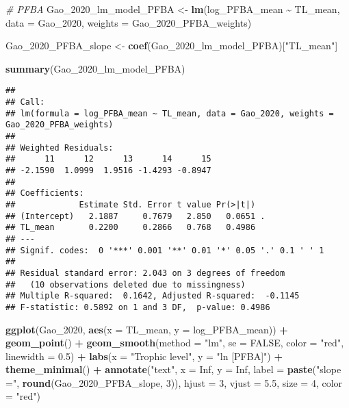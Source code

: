 \documentclass[
]{article}
\newenvironment{Shaded}{\begin{snugshade}}{\end{snugshade}}
\newcommand{\AttributeTok}[1]{\textcolor[rgb]{0.13,0.29,0.53}{#1}}
\newcommand{\CommentTok}[1]{\textcolor[rgb]{0.56,0.35,0.01}{\textit{#1}}}
\newcommand{\ConstantTok}[1]{\textcolor[rgb]{0.56,0.35,0.01}{#1}}
\newcommand{\DecValTok}[1]{\textcolor[rgb]{0.00,0.00,0.81}{#1}}
\newcommand{\FloatTok}[1]{\textcolor[rgb]{0.00,0.00,0.81}{#1}}
\newcommand{\FunctionTok}[1]{\textcolor[rgb]{0.13,0.29,0.53}{\textbf{#1}}}
\newcommand{\NormalTok}[1]{#1}
\newcommand{\OtherTok}[1]{\textcolor[rgb]{0.56,0.35,0.01}{#1}}
\newcommand{\SpecialCharTok}[1]{\textcolor[rgb]{0.81,0.36,0.00}{\textbf{#1}}}
\newcommand{\StringTok}[1]{\textcolor[rgb]{0.31,0.60,0.02}{#1}}
\begin{document}
\begin{Shaded}
\begin{Highlighting}[]
\CommentTok{\# PFBA}
\NormalTok{Gao\_2020\_lm\_model\_PFBA }\OtherTok{\textless{}{-}} \FunctionTok{lm}\NormalTok{(log\_PFBA\_mean }\SpecialCharTok{\textasciitilde{}}\NormalTok{ TL\_mean,}
                             \AttributeTok{data =}\NormalTok{ Gao\_2020,}
                             \AttributeTok{weights =}\NormalTok{ Gao\_2020\_PFBA\_weights)}

\NormalTok{Gao\_2020\_PFBA\_slope }\OtherTok{\textless{}{-}} \FunctionTok{coef}\NormalTok{(Gao\_2020\_lm\_model\_PFBA)[}\StringTok{"TL\_mean"}\NormalTok{]}

\FunctionTok{summary}\NormalTok{(Gao\_2020\_lm\_model\_PFBA)}
\end{Highlighting}
\end{Shaded}

\begin{verbatim}
## 
## Call:
## lm(formula = log_PFBA_mean ~ TL_mean, data = Gao_2020, weights = Gao_2020_PFBA_weights)
## 
## Weighted Residuals:
##      11      12      13      14      15 
## -2.1590  1.0999  1.9516 -1.4293 -0.8947 
## 
## Coefficients:
##             Estimate Std. Error t value Pr(>|t|)  
## (Intercept)   2.1887     0.7679   2.850   0.0651 .
## TL_mean       0.2200     0.2866   0.768   0.4986  
## ---
## Signif. codes:  0 '***' 0.001 '**' 0.01 '*' 0.05 '.' 0.1 ' ' 1
## 
## Residual standard error: 2.043 on 3 degrees of freedom
##   (10 observations deleted due to missingness)
## Multiple R-squared:  0.1642, Adjusted R-squared:  -0.1145 
## F-statistic: 0.5892 on 1 and 3 DF,  p-value: 0.4986
\end{verbatim}

\begin{Shaded}
\begin{Highlighting}[]
\FunctionTok{ggplot}\NormalTok{(Gao\_2020, }\FunctionTok{aes}\NormalTok{(}\AttributeTok{x =}\NormalTok{ TL\_mean, }\AttributeTok{y =}\NormalTok{ log\_PFBA\_mean)) }\SpecialCharTok{+}
  \FunctionTok{geom\_point}\NormalTok{() }\SpecialCharTok{+}
  \FunctionTok{geom\_smooth}\NormalTok{(}\AttributeTok{method =} \StringTok{"lm"}\NormalTok{, }\AttributeTok{se =} \ConstantTok{FALSE}\NormalTok{, }\AttributeTok{color =} \StringTok{"red"}\NormalTok{, }\AttributeTok{linewidth =} \FloatTok{0.5}\NormalTok{) }\SpecialCharTok{+}
  \FunctionTok{labs}\NormalTok{(}\AttributeTok{x =} \StringTok{"Trophic level"}\NormalTok{,}
       \AttributeTok{y =} \StringTok{"ln [PFBA]"}\NormalTok{) }\SpecialCharTok{+}
  \FunctionTok{theme\_minimal}\NormalTok{() }\SpecialCharTok{+}
  \FunctionTok{annotate}\NormalTok{(}\StringTok{"text"}\NormalTok{, }\AttributeTok{x =} \ConstantTok{Inf}\NormalTok{, }\AttributeTok{y =} \ConstantTok{Inf}\NormalTok{, }\AttributeTok{label =} \FunctionTok{paste}\NormalTok{(}\StringTok{"slope ="}\NormalTok{, }\FunctionTok{round}\NormalTok{(Gao\_2020\_PFBA\_slope, }\DecValTok{3}\NormalTok{)), }
           \AttributeTok{hjust =} \DecValTok{3}\NormalTok{, }\AttributeTok{vjust =} \FloatTok{5.5}\NormalTok{, }\AttributeTok{size =} \DecValTok{4}\NormalTok{, }\AttributeTok{color =} \StringTok{"red"}\NormalTok{)}
\end{Highlighting}
\end{Shaded}
\end{document}
